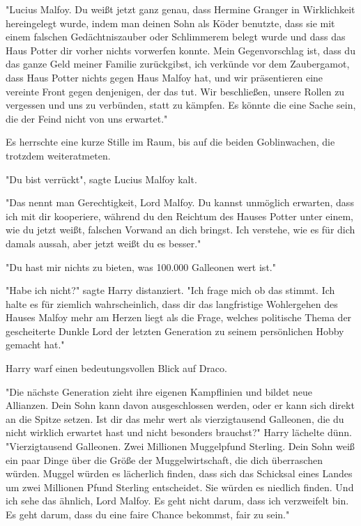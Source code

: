 {"Lucius Malfoy. Du weißt jetzt ganz genau, dass Hermine Granger in Wirklichkeit hereingelegt wurde, indem man deinen Sohn als Köder benutzte, dass sie mit einem falschen Gedächtniszauber oder Schlimmerem belegt wurde und dass das Haus Potter dir vorher nichts vorwerfen konnte. Mein Gegenvorschlag ist, dass du das ganze Geld meiner Familie zurückgibst, ich verkünde vor dem Zaubergamot, dass Haus Potter nichts gegen Haus Malfoy hat, und wir präsentieren eine vereinte Front gegen denjenigen, der das tut. Wir beschließen, unsere Rollen zu vergessen und uns zu verbünden, statt zu kämpfen. Es könnte die eine Sache sein, die der Feind nicht von uns erwartet."

Es herrschte eine kurze Stille im Raum, bis auf die beiden Goblinwachen, die trotzdem weiteratmeten.

"Du bist verrückt", sagte Lucius Malfoy kalt.

"Das nennt man Gerechtigkeit, Lord Malfoy. Du kannst unmöglich erwarten, dass ich mit dir kooperiere, während du den Reichtum des Hauses Potter unter einem, wie du jetzt weißt, falschen Vorwand an dich bringst. Ich verstehe, wie es für dich damals aussah, aber jetzt weißt du es besser."

"Du hast mir nichts zu bieten, was 100.000 Galleonen wert ist."

"Habe ich nicht?" sagte Harry distanziert. "Ich frage mich ob das stimmt. Ich halte es für ziemlich wahrscheinlich, dass dir das langfristige Wohlergehen des Hauses Malfoy mehr am Herzen liegt als die Frage, welches politische Thema der gescheiterte Dunkle Lord der letzten Generation zu seinem persönlichen Hobby gemacht hat."

Harry warf einen bedeutungsvollen Blick auf Draco.

"Die nächste Generation zieht ihre eigenen Kampflinien und bildet neue Allianzen. Dein Sohn kann davon ausgeschlossen werden, oder er kann sich direkt an die Spitze setzen. Ist dir das mehr wert als vierzigtausend Galleonen, die du nicht wirklich erwartet hast und nicht besonders brauchst?" Harry lächelte dünn. "Vierzigtausend Galleonen. Zwei Millionen Muggelpfund Sterling. Dein Sohn weiß ein paar Dinge über die Größe der Muggelwirtschaft, die dich überraschen würden. Muggel würden es lächerlich finden, dass sich das Schicksal eines Landes um zwei Millionen Pfund Sterling entscheidet. Sie würden es niedlich finden. Und ich sehe das ähnlich, Lord Malfoy. Es geht nicht darum, dass ich verzweifelt bin. Es geht darum, dass du eine faire Chance bekommst, fair zu sein."

}

